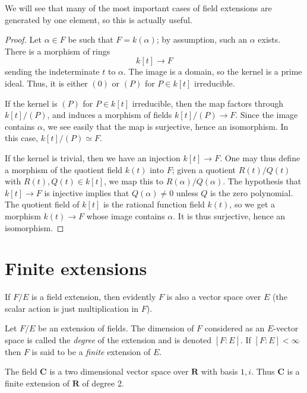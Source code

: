 \noindent
We will see that many of the most important cases of field extensions are
generated by one element, so this is actually useful.

\begin{proof}
Let $\alpha \in F$ be such that $F = k(\alpha)$; by assumption, such an
$\alpha$ exists. There is a morphism of rings
$$
k[t] \to F
$$
sending the indeterminate $t$ to $\alpha$. The image is a domain, so the
kernel is a prime ideal. Thus, it is either $(0)$ or $(P)$ for $P \in k[t]$
irreducible.

\medskip\noindent
If the kernel is $(P)$ for $P \in k[t]$ irreducible, then the map factors
through $k[t]/(P)$, and induces a morphism of fields $k[t]/(P) \to F$. Since
the image contains $\alpha$, we see easily that the map is surjective, hence
an isomorphism. In this case, $k[t]/(P) \simeq F$.

\medskip\noindent
If the kernel is trivial, then we have an injection $k[t] \to F$.
One may thus define a morphism of the quotient field $k(t)$ into $F$; given a
quotient $R(t)/Q(t)$ with $R(t), Q(t) \in k[t]$, we map this to
$R(\alpha)/Q(\alpha)$. The hypothesis that $k[t] \to F$ is injective implies
that $Q(\alpha) \neq 0$ unless $Q$ is the zero polynomial.
The quotient field of $k[t]$ is the rational function field $k(t)$, so we get
a morphism $k(t) \to F$
whose image contains $\alpha$. It is thus surjective, hence an isomorphism.
\end{proof}




\section{Finite extensions}
\label{section-finite-extensions}

\noindent
If $F/E$ is a field extension, then evidently $F$ is also a vector space
over $E$ (the scalar action is just multiplication in $F$).

\begin{definition}
\label{definition-degree}
Let $F/E$ be an extension of fields. The dimension of $F$ considered as an
$E$-vector space is called the {\it degree} of the extension and is
denoted $[F : E]$. If $[F : E] < \infty$ then $F$ is said to be a
{\it finite} extension of $E$.
\end{definition}

\begin{example}
\label{example-C-over-R}
The field $\mathbf{C}$ is a two dimensional vector space over $\mathbf{R}$
with basis $1, i$. Thus $\mathbf{C}$ is a finite extension of $\mathbf{R}$
of degree 2.
\end{example}

